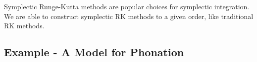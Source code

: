 \documentclass{report}
\newtheorem{theorem}{Theorem}[chapter]
\theoremstyle{exampstyle} \newtheorem{example}[theorem]{Example}
\theoremstyle{exampstyle} \newtheorem{remark}[theorem]{Remark}
\theoremstyle{exampstyle} \newtheorem{definition}[theorem]{Definition}
\theoremstyle{exampstyle} \newtheorem{lemma}[theorem]{Lemma}
\begin{document}



Symplectic Runge-Kutta methods are popular choices for symplectic integration.
We are able to construct symplectic RK methods to a given order, like traditional RK methods.

\subsection{Example - A Model for Phonation}

\end{document}
